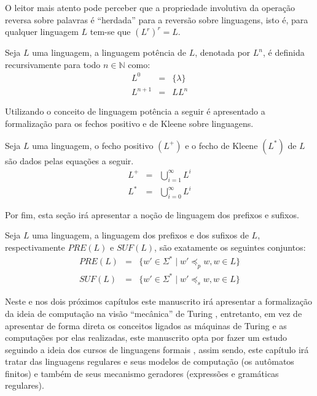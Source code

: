 O leitor mais atento pode perceber que a propriedade involutiva da operação reversa sobre palavras é ``herdada'' para a reversão sobre linguagens, isto é, para qualquer linguagem $L$ tem-se que $(L^r)^r = L$. 

\begin{definition}
	Seja $L$ uma linguagem, a linguagem potência de $L$, denotada por $L^n$, é definida recursivamente para todo $n \in \mathbb{N}$ como:
	\begin{eqnarray}
		L^0 & = &\{\lambda\}\\
		L^{n+1} & = &  LL^{n}
	\end{eqnarray}
\end{definition}

Utilizando o conceito de linguagem potência a seguir é apresentado a formalização para os fechos positivo e de Kleene sobre linguagens.

\begin{definition}\label{def:FechoPositivoKleeneLinguagem}
	Seja $L$ uma linguagem, o fecho positivo $(L^+)$ e o fecho de Kleene $(L^*)$ de $L$ são dados pelas equações a seguir.
	\begin{eqnarray}
		L^+ & = & \bigcup_{i = 1}^\infty L^i\\
		L^* & = & \bigcup_{i = 0}^\infty L^i
	\end{eqnarray}
\end{definition}

Por fim, esta seção irá apresentar a noção de linguagem dos prefixos e sufixos.

\begin{definition}\label{def:LinguagemPrefixosSufixos}
	Seja $L$ uma linguagem, a linguagem dos prefixos e dos sufixos de $L$, respectivamente $PRE(L)$ e $SUF(L)$, são exatamente os seguintes conjuntos:
	\begin{eqnarray*}
		PRE(L) & = & \{w' \in \Sigma^* \mid w' \preceq_p w, w \in L\}\\
		SUF(L) & = & \{w' \in \Sigma^* \mid w' \preceq_s w, w \in L\}
	\end{eqnarray*}
\end{definition}

Neste e nos dois próximos capítulos este manuscrito irá apresentar a formalização da ideia de computação na visão ``mecânica'' de Turing \cite{turing1937}, entretanto, em vez de apresentar de forma direta os conceitos ligados as máquinas de Turing e as computações por elas realizadas, este manuscrito opta por fazer um estudo seguindo a ideia dos cursos de linguagens formais \cite{benjaLivro2010, linz2006, menezes1998LFA}, assim sendo, este capítulo irá tratar das linguagens regulares e seus modelos de computação (os autômatos finitos) e também de seus mecanismo geradores (expressões e gramáticas regulares). 

